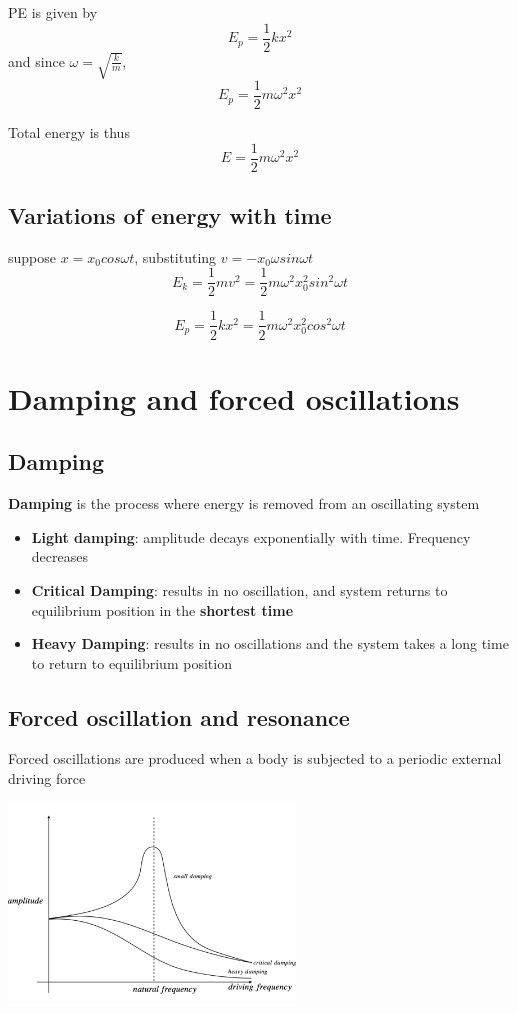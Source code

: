 \documentclass[a4paper, 10pt]{article}
\begin{document}
PE is given by
\[
E_p = \frac{1}{2} kx^2 
\]
and since $\omega = \sqrt{\frac{k}{m}}$, 
\[
E_p = \frac{1}{2} m \omega^2 x^2
\]

Total energy is thus
\[
E = \frac{1}{2}m\omega^2 x^2
\]

\subsection{Variations of energy with time}
suppose $x = x_0 cos\omega t$, substituting $v = -x_0 \omega sin \omega t$ 
\[
   E_k = \frac{1}{2} mv^2 = \frac{1}{2} m \omega^2 x_0^2 sin^2 \omega t
\]

\[
E_p = \frac{1}{2}kx^2 = \frac{1}{2} m \omega^2 x_0^2 cos^2 \omega t
\]


\section{Damping and forced oscillations}
\subsection{Damping}
\begin{framed}
   \textbf{Damping} is the process where energy is removed from an oscillating system
\end{framed}	
\begin{itemize}
   \item \textbf{Light damping}: amplitude decays exponentially with time. Frequency decreases
   \item \textbf{Critical Damping}: results in no oscillation, and system returns to equilibrium position in the \textbf{shortest time}
   \item \textbf{Heavy Damping}: results in no oscillations and the system takes a long time to return to equilibrium position
\end{itemize}	

\subsection{Forced oscillation and resonance}
\begin{framed}
   Forced oscillations are produced when a body is subjected to a periodic external driving force
\end{framed}	

\begin{center}
\includegraphics[trim = 50 50 50 50, width=3in]{figures/4.pdf} 
\end{center}	
\end{document}
